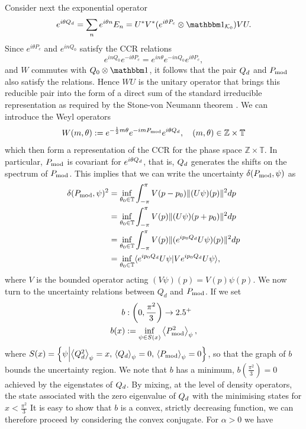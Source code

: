Consider next the exponential operator $$e^{i\theta \Qd}= \sum_n e^{i\theta n} E_n = U^*V^*(e^{i\theta P_c}\otimes \id_{\mathcal K_0})VU.$$
Since $e^{i\theta P_c}$ and $e^{in Q_0}$ satisfy the CCR relations
$$
e^{in Q_0}e^{-i\theta P_c} = e^{in\theta} e^{-in Q_0}e^{i\theta P_c},
$$
and $W$ commutes with $Q_0\otimes \id$, it follows that the pair $Q_d$ and $P_{\mathrm{mod}}$ also satisfy the relations. Hence $WU$ is the unitary operator that brings this reducible pair into the form of a direct sum of the standard irreducible representation as required by the Stone-von Neumann theorem \cite{}. We can introduce the Weyl operators 
$$
W(m,\theta) := e^{-\frac 12 m\theta} e^{-im P_{\mathrm{mod}}}e^{i\theta Q_d}, \quad (m,\theta) \in \mathbb Z\times \mathbb T
$$
which then form a representation of the CCR for the phase space $\mathbb Z\times \mathbb T$. In particular, $P_{\mathrm{mod}}$ is covariant for $e^{i\theta Q_d}$, that is, $Q_d$ generates the shifts on the spectrum of $P_{\mathrm{mod}}$. This implies that we can write the uncertainty $\delta(P_{\mathrm{mod}},\psi)$ as
\begin{align*}
\delta(P_{\mathrm{mod}},\psi)^2 &= \inf_{\theta_0\in \mathbb T} \int_{-\pi}^\pi V(p-p_0) \|(U\psi)(p)\|^2 dp\\
&= \inf_{\theta_0\in \mathbb T} \int_{-\pi}^\pi V(p) \|(U\psi)(p+p_0)\|^2 dp\\
&= \inf_{\theta_0\in \mathbb T} \int_{-\pi}^\pi V(p) \|(e^{ip_0Q_d}U\psi)(p)\|^2 dp\\
&= \inf_{\theta_0\in \mathbb T} \langle e^{ip_0Q_d}U\psi| V e^{ip_0Q_d}U\psi\rangle,
\end{align*}
where $V$ is the bounded operator acting $(V\psi)(p) = V(p)\psi(p)$. We now turn to the uncertainty relations between $Q_d$ and $P_{\mathrm{mod}}$. If we set
\begin{align*}
  b&:\left(0,\frac{\pi^2}{3}\right)\to 2.5^+\\
  b(x) &:= \inf_{\psi\in S(x)} \left\langle{P_{\mathrm{mod}}^2}\right\rangle_{\psi},
\end{align*}
where $S(x) = \left\{\psi\middle| \left\langle{Q_d^2}\right\rangle_{\psi} = x,\,\left\langle{Q_d}\right\rangle_{\psi} = 0,\,\left\langle{P_{\mathrm{mod}}}\right\rangle_{\psi} = 0 \right\}$, so that the graph of $b$ bounds the uncertainty region. We note that $b$ has a minimum, $b\left(\frac{\pi^2}{3}\right) = 0$ achieved by the eigenstates of $Q_d$. By mixing, at the level of density operators, the state associated with the zero eigenvalue of $Q_d$ with the minimising states for $x < \frac{\pi^2}{3}$ It is easy to show that $b$ is a convex, strictly decreasing function, we can therefore proceed by considering the convex conjugate. For $\alpha > 0$ we have
